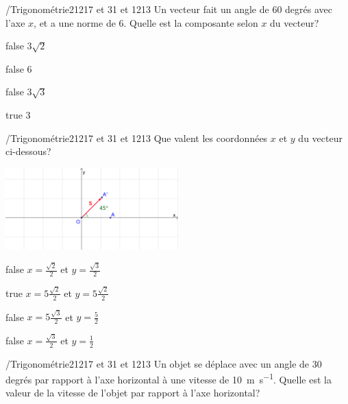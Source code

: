 			\begin{question}{/}{Trigonométrie}{2}{1217 et 31 et 1213}
				Un vecteur fait un angle de 60 degrés avec l'axe $x$, et a une norme de 6. Quelle est la composante selon $x$ du vecteur?
            \end{question}
            \begin{reponses}
            	\item[false] $3\sqrt{2}$
            	\item[false] 6
                \item[false] $3\sqrt{3}$
                \item[true] 3
            \end{reponses}
            \begin{question}{/}{Trigonométrie}{2}{1217 et 31 et 1213}
                Que valent les coordonnées $x$ et $y$ du vecteur ci-dessous?
                \begin{center}
                	\includegraphics[width=0.5\textwidth]{Philippe/Figures_Philippe/trigo_1_5.png}
                \end{center}
            \end{question}
            \begin{reponses}
                \item[false] $x = \frac{\sqrt{2}}{2}$ et $y = \frac{\sqrt{3}}{2}$
                \item[true] $x = 5\frac{\sqrt{2}}{2}$ et $y = 5\frac{\sqrt{2}}{2}$
                \item[false] $x = 5\frac{\sqrt{3}}{2}$ et $y = \frac{5}{2}$
                \item[false] $x = \frac{\sqrt{3}}{2}$ et $y = \frac{1}{2}$
            \end{reponses}
            \begin{question}{/}{Trigonométrie}{2}{1217 et 31 et 1213}
            	Un objet se déplace avec un angle de 30 degrés par rapport à l'axe horizontal à une vitesse de \SI{10}{\meter\per\second}. Quelle est la valeur de la vitesse de l'objet par rapport à l'axe horizontal?
            \end{question}
